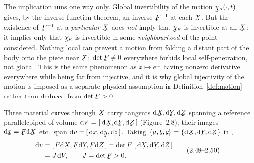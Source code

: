 \begin{remark}
\label{rem:localinv}
The implication runs one way only. Global invertibility of the motion
$\bchi_\kappa(\cdot,t)$ gives, by the inverse function theorem, an inverse
$\bF^{-1}$ at each $\bX$. But the existence of $\bF^{-1}$ at a
\emph{particular} $\bX$ does \emph{not} imply that $\bchi_\kappa$ is
invertible at all $\bX$: it implies only that $\bchi_\kappa$ is invertible in
some \emph{neighbourhood} of the point considered. Nothing local can prevent
a motion from folding a distant part of the body onto the piece near $\bX$;
$\det\bF\neq0$ everywhere forbids local self-penetration, not global. This is
the same phenomenon as $x\mapsto e^{\mathrm{i}x}$ having nonzero derivative
everywhere while being far from injective, and it is why global
injectivity of the motion is imposed as a separate physical assumption in
Definition~\ref{def:motion} rather than deduced from $\det\bF>0$.
\end{remark}

\noindent Three
material curves through $\bX$ carry tangents $\dl\bX,\dl\bY,\dl\bZ$ spanning
a reference parallelepiped of volume $\dl V=\tbox{\dl\bX}{\dl\bY}{\dl\bZ}$
(Figure~2.8); their images $\dl\bx=\bF\dl\bX$ etc.\ span
$\dl v=\tbox{\dl\bx}{\dl\by}{\dl\bz}$. Taking $\{\ba,\bb,\bc\}=\{\dl\bX,\dl\bY,\dl\bZ\}$
in ,
\begin{equation}
\begin{aligned}
   \dl v&=\tbox{\bF\dl\bX}{\bF\dl\bY}{\bF\dl\bZ}
        =\det\bF\;\tbox{\dl\bX}{\dl\bY}{\dl\bZ}\\
   &=J\,\dl V,\qquad J=\det\bF>0.
\end{aligned}
\tag{2.48--2.50}\label{eq:2.48}
\end{equation}

